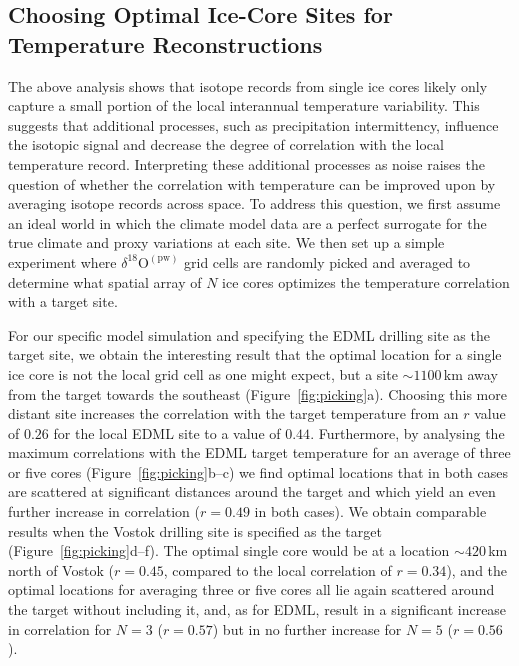 \documentclass[draft]{agujournal2019}
\begin{document}
\subsection{Choosing Optimal Ice-Core Sites for Temperature Reconstructions}
\label{results:picking}

The above analysis shows that isotope records from single ice cores likely only
capture a small portion of the local interannual temperature variability. This
suggests that additional processes, such as precipitation intermittency,
influence the isotopic signal and decrease the degree of correlation with the
local temperature record. Interpreting these additional processes as noise
raises the question of whether the correlation with temperature can be improved
upon by averaging isotope records across space. To address this question, we
first assume an ideal world in which the climate model data are a perfect
surrogate for the true climate and proxy variations at each site. We then set up
a simple experiment where $\delta^{18}\mathrm{O}^{\mathrm{(pw)}}$ grid cells are
randomly picked and averaged to determine what spatial array of $N$ ice cores
optimizes the temperature correlation with a target site.

For our specific model simulation and specifying the EDML drilling site as the
target site, we obtain the interesting result that the optimal location for a
single ice core is not the local grid cell as one might expect, but a site
$\sim1100$\,km away from the target towards the southeast
(Figure~\ref{fig:picking}a). Choosing this more distant site increases the
correlation with the target temperature from an $r$ value of $0.26$ for the
local EDML site to a value of $0.44$. Furthermore, by analysing the maximum
correlations with the EDML target temperature for an average of three or five
cores (Figure~\ref{fig:picking}b--c) we find optimal locations that in both cases
are scattered at significant distances around the target and which yield an even
further increase in correlation ($r=0.49$ in both cases). We obtain comparable
results when the Vostok drilling site is specified as the target
(Figure~\ref{fig:picking}d--f). The optimal single core would be at a location
$\sim420$\,km north of Vostok ($r=0.45$, compared to the local correlation of
$r=0.34$), and the optimal locations for averaging three or five cores all lie
again scattered around the target without including it, and, as for EDML, result
in a significant increase in correlation for $N=3$ ($r=0.57$) but in no further
increase for $N=5$ ($r=0.56$).
\end{document}
